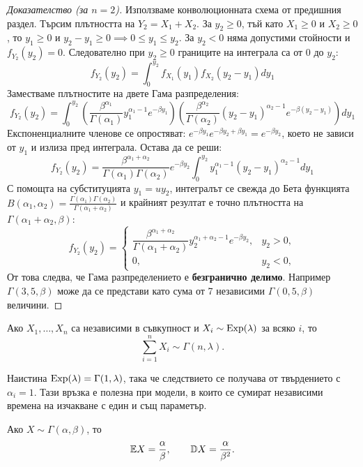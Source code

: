 \begin{proof}[Доказателство (за $n=2$)]
Използваме конволюционната схема от предишния раздел. Търсим плътността на $Y_2 = X_1 + X_2$. За $y_2\ge0$, тъй като $X_1 \ge 0$ и $X_2 \ge 0$, то $y_1 \ge 0$ и $y_2 - y_1 \ge 0 \implies 0 \le y_1 \le y_2$. За $y_2<0$ няма допустими стойности и $f_{Y_2}(y_2)=0$. Следователно при $y_2\ge0$ границите на интеграла са от $0$ до $y_2$:
\[
f_{Y_2}(y_2) = \int_{0}^{y_2} f_{X_1}(y_1) f_{X_2}(y_2 - y_1) dy_1
\]
Заместваме плътностите на двете Гама разпределения:
\[
f_{Y_2}(y_2) = \int_{0}^{y_2} \left( \frac{\beta^{\alpha_1}}{\Gamma(\alpha_1)} y_1^{\alpha_1 - 1} e^{-\beta y_1} \right) \left( \frac{\beta^{\alpha_2}}{\Gamma(\alpha_2)} (y_2 - y_1)^{\alpha_2 - 1} e^{-\beta (y_2 - y_1)} \right) dy_1
\]
Експоненциалните членове се опростяват: $e^{-\beta y_1} e^{-\beta y_2 + \beta y_1} = e^{-\beta y_2}$, което не зависи от $y_1$ и излиза пред интеграла. Остава да се реши:
\[
f_{Y_2}(y_2) = \frac{\beta^{\alpha_1+\alpha_2}}{\Gamma(\alpha_1)\Gamma(\alpha_2)} e^{-\beta y_2} \int_{0}^{y_2} y_1^{\alpha_1 - 1} (y_2 - y_1)^{\alpha_2 - 1} dy_1
\]
С помощта на субституцията $y_1 = u y_2$, интегралът се свежда до Бета функцията $B(\alpha_1, \alpha_2) = \frac{\Gamma(\alpha_1)\Gamma(\alpha_2)}{\Gamma(\alpha_1+\alpha_2)}$ и крайният резултат е точно плътността на $\Gamma(\alpha_1+\alpha_2, \beta)$:
\[
f_{Y_2}(y_2) =
\begin{cases}
\dfrac{\beta^{\alpha_1+\alpha_2}}{\Gamma(\alpha_1+\alpha_2)} y_2^{\alpha_1+\alpha_2-1} e^{-\beta y_2}, & y_2>0,\\
0, & y_2<0,
\end{cases}
\]
От това следва, че Гама разпределението е \textbf{безгранично делимо}. Например $\Gamma(3{,}5, \beta)$ може да се представи като сума от 7 независими $\Gamma(0{,}5, \beta)$ величини.
\end{proof}

\begin{cor}
Ако $X_1,\dots,X_n$ са независими в съвкупност и $X_i\sim\operatorname{Exp}(\lambda)$ за всяко $i$, то
\[
\sum_{i=1}^n X_i\sim\Gamma(n,\lambda).
\]
\end{cor}
Наистина $\operatorname{Exp}(\lambda)=\Gamma(1,\lambda)$, така че следствието се получава от твърдението с $\alpha_i=1$. Тази връзка е полезна при модели, в които се сумират независими времена на изчакване с един и същ параметър.

\begin{prop}
Ако $X\sim\Gamma(\alpha,\beta)$, то
\[
\mathbb{E} X=\frac{\alpha}{\beta},\qquad
\mathbb{D} X=\frac{\alpha}{\beta^2}.
\]
\end{prop}

